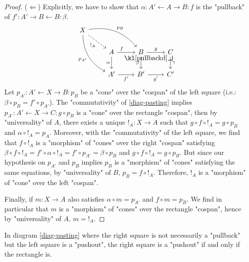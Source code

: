 \documentclass[main.tex]{subfiles}
\begin{document}
\begin{proof}
    ($\Leftarrow$) Explicitly, we have to show that $\alpha: A' \leftarrow A \rightarrow B: f$ is the "pullback" of $f': A' \rightarrow B \leftarrow B: \beta$. 
    \begin{equation}
    \begin{tikzcd}
X \arrow[rdd, "p_{A'}"', bend right] \arrow[rd, "{!}_A"', dashed] \arrow[rrd, "p_B", bend left] &                     &                                            &            \\
                                               & A \arrow[r, "f", near start] \arrow[d, "\alpha"'] & B \arrow[r, "g"] \arrow[d, "\beta"'] \arrow[rd, "\pullbackd", phantom, very near start] & C \arrow[d, "\gamma"] \\
                                               & A' \arrow[r, "f'"']                & B' \arrow[r, "g'"']                                  & C'          
\end{tikzcd}
    \end{equation}
    Let $p_{A'} : A' \leftarrow X \rightarrow B: p_B$ be a "cone" over the "cospan" of the left square (i.e.: $\beta \circ p_B = f' \circ p_{A'}$). The "commutativity" of \eqref{diag-pasting} implies $p_{A'}: A' \leftarrow X \rightarrow C: g \circ p_B$ is a "cone" over the rectangle "cospan", then by "universality" of $A$, there exists a unique ${!}_A: X \rightarrow A$ such that $g \circ f \circ {!}_A =  g \circ p_B$ and $\alpha \circ {!}_A = p_A$. Moreover, with the "commutativity" of the left square, we find that $f \circ {!}_A$ is a "morphism" of "cones" over the right "cospan" satisfying $\beta \circ f \circ {!}_A = f' \circ \alpha \circ {!}_A = f'\circ p_{A'} = \beta \circ p_B$ and $g \circ f \circ {!}_A = g \circ p_B$. But since our hypothesis on $p_{A'}$ and $p_B$ implies $p_B$ is a "morphism" of "cones" satisfying the same equations, by "universality" of $B$, $p_B = f \circ {!}_A$. Therefore, ${!}_A$ is a "morphism" of "cone" over the left "cospan".
    
    Finally, if $m: X \rightarrow A$ also satisfies $\alpha \circ m = p_{A'}$ and $f \circ m = p_B$. We find in particular that $m$ is a "morphism" of "cones" over the rectangle "cospan", hence by "universality" of $A$, $m = {!}_A$.
\end{proof}
\begin{cor}%
    In diagram \eqref{diag-pasting} where the right square is not necessarily a "pullback" but the left square is a "pushout", the right square is a "pushout" if and only if the rectangle is.
\end{cor}
\end{document}
